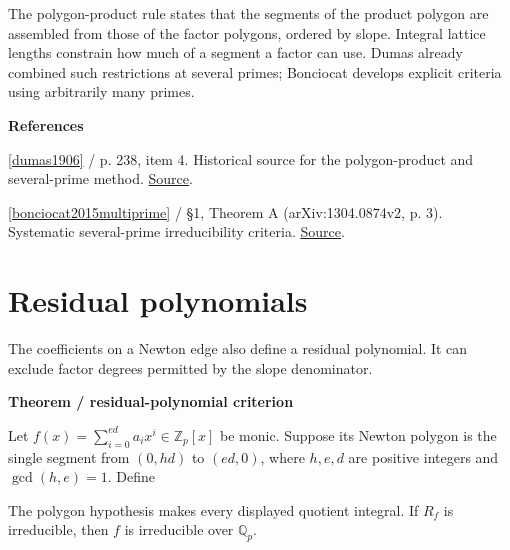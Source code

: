 \documentclass[11pt,a4paper,oneside,openany]{book}
\newcommand{\atlasdisplay}[1]{\par\begingroup\centering\vspace{3pt}\noindent\adjustbox{max width=\linewidth}{\(\displaystyle #1\)}\par\vspace{5pt}\endgroup}
\newenvironment{sources}{\par\smallskip\begingroup\footnotesize\color{atlasgray}\leftskip=10pt\setlength{\parskip}{2pt}}{\par\endgroup\smallskip}
\begin{document}
\color{black} The polygon-product rule states that the segments of the product polygon are assembled from those of the factor polygons, ordered by slope. Integral lattice lengths constrain how much of a segment a factor can use. Dumas already combined such restrictions at several primes; Bonciocat develops explicit criteria using arbitrarily many primes.\par
\begin{sources}
\textbf{References}\par\smallskip
\noindent\hyperlink{ref:dumas1906}{[dumas1906]} / p. 238, item 4. Historical source for the polygon-product and several-prime method. \href{https://www.numdam.org/item/JMPA_1906_6_2__191_0/}{Source}.\par
\noindent\hyperlink{ref:bonciocat2015multiprime}{[bonciocat2015multiprime]} / §1, Theorem A (arXiv:1304.0874v2, p. 3). Systematic several-prime irreducibility criteria. \href{https://www.tandfonline.com/doi/abs/10.1080/00927872.2014.910800}{Source}.\par
\end{sources}\color{black}
\section{Residual polynomials}
\color{black} The coefficients on a Newton edge also define a residual polynomial. It can exclude factor degrees permitted by the slope denominator.\par


\begin{atlasblock}[standard]
\textbf{\sffamily Theorem  /  residual-polynomial criterion}\par\smallskip
\color{black} Let \(f(x)=\sum_{i=0}^{ed}a_ix^i\in\mathbb Z_p[x]\) be monic. Suppose its Newton polygon is the single segment from \((0,hd)\) to \((ed,0)\), where \(h,e,d\) are positive integers and \(\gcd(h,e)=1\). Define\par


\atlasdisplay{R_f(Y)=\sum_{j=0}^{d}\overline{\frac{a_{ej}}{p^{h(d-j)}}}\,Y^j\in\mathbb F_p[Y].}

\color{black} The polygon hypothesis makes every displayed quotient integral. If \(R_f\) is irreducible, then \(f\) is irreducible over \(\mathbb Q_p\).\par
\end{atlasblock}\color{black}
\end{document}
